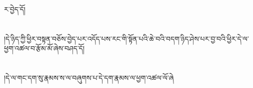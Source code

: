 ར་བྱེད་དོ།\chapter{ }།དེ་ཉིད་ཀྱི་ཕྱིར་བསྟན་བཅོས་བྱེད་པར་འདོད་པས་རང་གི་སྟོན་པའི་ཆེ་བའི་བདག་ཉིད་ཤེས་པར་བྱ་བའི་ཕྱིར་དེ་ལ་ཕྱག་འཚལ་བ་རྩོམ་མོ་ཞེས་བཤད་དོ།\chapter{ }།དེ་ལ་གང་དག་སུ་རྣམས་ས་ལ་བཞུགས་པ་དེ་དག་རྣམས་ལ་ཕྱག་འཚལ་ལོ་ཞེ